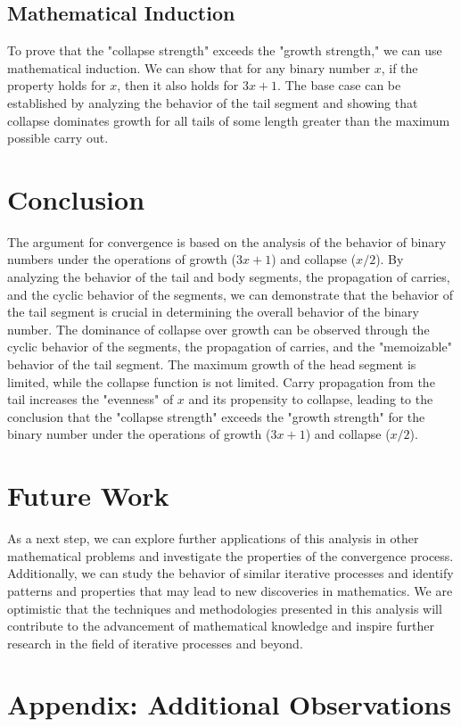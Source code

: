 \documentclass{article}
\begin{document}
\subsection{Mathematical Induction}
To prove that the "collapse strength" exceeds the "growth strength," we can use mathematical induction. We can show that for any binary number $x$, if the property holds for $x$, then it also holds for $3x + 1$. The base case can be established by analyzing the behavior of the tail segment and showing that collapse dominates growth for all tails of some length greater than the maximum possible carry out.

\section{Conclusion}
The argument for convergence is based on the analysis of the behavior of binary numbers under the operations of growth ($3x + 1$) and collapse ($x/2$). By analyzing the behavior of the tail and body segments, the propagation of carries, and the cyclic behavior of the segments, we can demonstrate that the behavior of the tail segment is crucial in determining the overall behavior of the binary number. The dominance of collapse over growth can be observed through the cyclic behavior of the segments, the propagation of carries, and the "memoizable" behavior of the tail segment. The maximum growth of the head segment is limited, while the collapse function is not limited. Carry propagation from the tail increases the "evenness" of $x$ and its propensity to collapse, leading to the conclusion that the "collapse strength" exceeds the "growth strength" for the binary number under the operations of growth ($3x + 1$) and collapse
($x/2$).

\section{Future Work}
As a next step, we can explore further applications of this analysis in other mathematical problems and investigate the properties of the convergence process. Additionally, we can study the behavior of similar iterative processes and identify patterns and properties that may lead to new discoveries in mathematics. We are optimistic that the techniques and methodologies presented in this analysis will contribute to the advancement of mathematical knowledge and inspire further research in the field of iterative processes and beyond.
\section{Appendix: Additional Observations}
\end{document}
